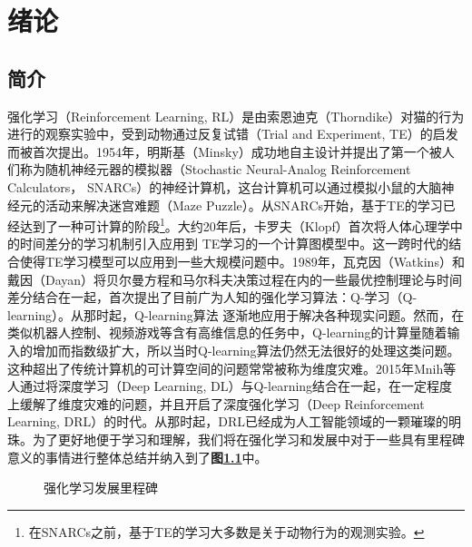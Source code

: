 \chapter{绪论} 
\label{chpt:A}


\section{简介}

强化学习（Reinforcement Learning, RL）是由索恩迪克（Thorndike）对猫的行为进行的观察实验中，受到动物通过反复试错（Trial and Experiment, TE）的启发而被首次提出。1954年，明斯基（Minsky）成功地自主设计并提出了第一个被人们称为随机神经元器的模拟器（Stochastic Neural-Analog Reinforcement Calculators， SNARCs）的神经计算机，这台计算机可以通过模拟小鼠的大脑神经元的活动来解决迷宫难题（Maze Puzzle）。从SNARCs开始，基于TE的学习已经达到了一种可计算的阶段\footnote{在SNARCs之前，基于TE的学习大多数是关于动物行为的观测实验。}。大约20年后，卡罗夫（Klopf）首次将人体心理学中的时间差分的学习机制引入应用到 TE学习的一个计算图模型中。这一跨时代的结合使得TE学习模型可以应用到一些大规模问题中。1989年，瓦克因（Watkins）和戴因（Dayan）将贝尔曼方程和马尔科夫决策过程在内的一些最优控制理论与时间差分结合在一起，首次提出了目前广为人知的强化学习算法：Q-学习（Q-learning）。从那时起，Q-learning算法
逐渐地应用于解决各种现实问题。然而，在类似机器人控制、视频游戏等含有高维信息的任务中，Q-learning的计算量随着输入的增加而指数级扩大，所以当时Q-learning算法仍然无法很好的处理这类问题。这种超出了传统计算机的可计算空间的问题常常被称为维度灾难。2015年Mnih等人通过将深度学习（Deep Learning, DL）与Q-learning结合在一起，在一定程度上缓解了维度灾难的问题，并且开启了深度强化学习（Deep Reinforcement Learning, DRL）的时代。从那时起，DRL已经成为人工智能领域的一颗璀璨的明珠。为了更好地便于学习和理解，我们将在强化学习和发展中对于一些具有里程碑意义的事情进行整体总结并纳入到了\textbf{图\ref{Fig:rl milestone}}中。

\begin{figure}[!t]
	\centering
	\caption{强化学习发展里程碑}
	\label{Fig:rl milestone}
\end{figure}

